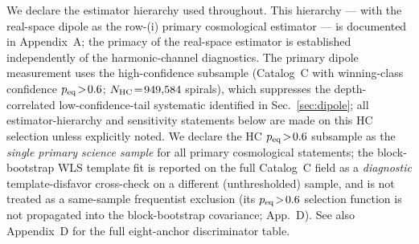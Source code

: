 \documentclass[aps,prd,twocolumn,superscriptaddress,preprintnumbers,nofootinbib,longbibliography,floatfix]{revtex4-2}
\begin{document}
We declare the estimator hierarchy used throughout. This hierarchy --- with the real-space dipole as the row-(i) primary cosmological estimator --- is documented in Appendix~A; the primacy of the real-space estimator is established independently of the harmonic-channel diagnostics. The primary dipole measurement uses the high-confidence subsample (Catalog~C with winning-class confidence $p_{\rm eq}\!>\!0.6$; $N_{\rm HC}\!=\!949{,}584$ spirals), which suppresses the depth-correlated low-confidence-tail systematic identified in Sec.~\ref{sec:dipole}; all estimator-hierarchy and sensitivity statements below are made on this HC selection unless explicitly noted. We declare the HC $p_{\rm eq}\!>\!0.6$ subsample as the \emph{single primary science sample} for all primary cosmological statements; the block-bootstrap WLS template fit is reported on the full Catalog~C field as a \emph{diagnostic} template-disfavor cross-check on a different (unthresholded) sample, and is not treated as a same-sample frequentist exclusion (its $p_{\rm eq}\!>\!0.6$ selection function is not propagated into the block-bootstrap covariance; App.~D). See also Appendix~D for the full eight-anchor discriminator table.
\end{document}
